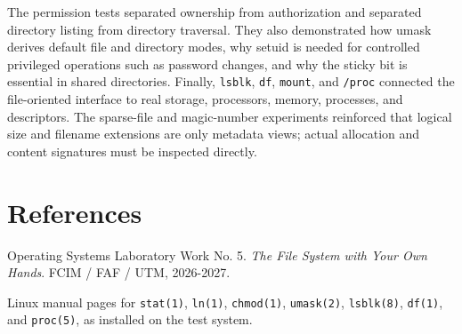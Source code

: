 \documentclass[12pt,a4paper]{article}
\begin{document}
The permission tests separated ownership from authorization and separated directory listing from directory traversal. They also demonstrated how umask derives default file and directory modes, why setuid is needed for controlled privileged operations such as password changes, and why the sticky bit is essential in shared directories. Finally, \texttt{lsblk}, \texttt{df}, \texttt{mount}, and \texttt{/proc} connected the file-oriented interface to real storage, processors, memory, processes, and descriptors. The sparse-file and magic-number experiments reinforced that logical size and filename extensions are only metadata views; actual allocation and content signatures must be inspected directly.

\newpage
\section*{References}

\noindent[1] Operating Systems Laboratory Work No. 5. \textit{The File System with Your Own Hands}. FCIM / FAF / UTM, 2026-2027.

\vspace{0.6cm}
\noindent[2] Linux manual pages for \texttt{stat(1)}, \texttt{ln(1)}, \texttt{chmod(1)}, \texttt{umask(2)}, \texttt{lsblk(8)}, \texttt{df(1)}, and \texttt{proc(5)}, as installed on the test system.
\end{document}
